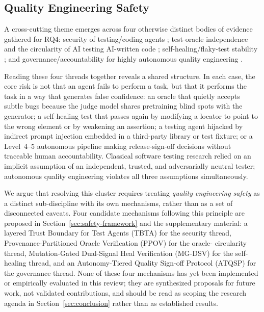 \subsection{Quality Engineering Safety}
\label{sec:qe-safety}
A cross-cutting theme emerges across four otherwise distinct bodies of
evidence gathered for RQ4: security of testing/coding agents
\cite{zhan2024injecagent,debenedetti2024agentdojo,guo2024redcode,
she2025queryipi,sakib2026trustverify,kozak2025developeraid,
shi2025progent,wu2024isolategpt,wu2026skillshield,xie2026vibeguard,
kokkonis2025rosa}; test-oracle independence and the circularity of AI
testing AI-written code
\cite{bodicoat2026oracle,molina2024oracleautomation,xu2025candor,
wataoka2024selfpreference,panickssery2024evaluators,huang2023selfcorrect,
olausson2023selfrepair}; self-healing/flaky-test stability
\cite{alshammari2024flakyclassifiers,parry2023cannier,
leinen2026detectedundetected,parry2025systemic,lam2020lifecycle,
meta2020pfs,joseph2026zerocost,rohamo2024robotframework,ijam2025healenium};
and governance/accountability for highly autonomous quality engineering
\cite{iso2020tr29119,iso2025ts42119,feng2025autonomylevels,
treude2026accountable,cheng2026threepillar,ibm2024trew,
passi2025overreliance,ibrahim2025overreliance,kiran2026humanai}.

Reading these four threads together reveals a shared structure. In each
case, the core risk is not that an agent fails to perform a task, but
that it performs the task in a way that generates false confidence: an
oracle that quietly accepts subtle bugs because the judge model shares
pretraining blind spots with the generator; a self-healing test that
passes again by modifying a locator to point to the wrong element or by
weakening an assertion; a testing agent hijacked by indirect prompt
injection embedded in a third-party library or test fixture; or a
Level~4--5 autonomous pipeline making release-sign-off decisions without
traceable human accountability. Classical software testing research
relied on an implicit assumption of an independent, trusted, and
adversarially neutral tester; autonomous quality engineering violates
all three assumptions simultaneously.

We argue that resolving this cluster requires treating \emph{quality
engineering safety} as a distinct sub-discipline with its own
mechanisms, rather than as a set of disconnected caveats. Four
candidate mechanisms following this principle are proposed in
Section~\ref{sec:safety-framework} and the supplementary material:
a layered Trust Boundary for Test Agents (TBTA) for the security thread,
Provenance-Partitioned Oracle Verification (PPOV) for the oracle-
circularity thread, Mutation-Gated Dual-Signal Heal Verification
(MG-DSV) for the self-healing thread, and an Autonomy-Tiered Quality
Sign-off Protocol (ATQSP) for the governance thread. None of these four
mechanisms has yet been implemented or empirically evaluated in this
review; they are synthesized proposals for future work, not validated
contributions, and should be read as scoping the research agenda in
Section~\ref{sec:conclusion} rather than as established results.

